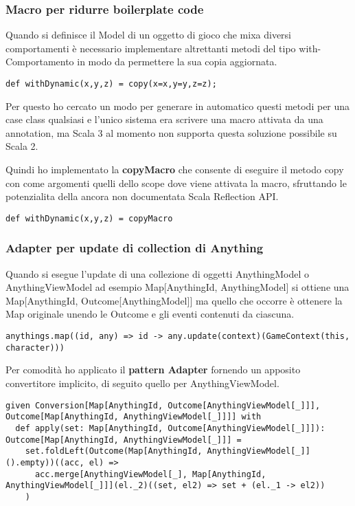 \subsubsection{Macro per ridurre boilerplate code}
Quando si definisce il Model di un oggetto di gioco che mixa diversi comportamenti è necessario implementare altrettanti metodi del tipo with-Comportamento in modo da permettere la sua copia aggiornata. 

\begin{lstlisting}[basicstyle=\tiny]
def withDynamic(x,y,z) = copy(x=x,y=y,z=z); 
\end{lstlisting}

Per questo ho cercato un modo per generare in automatico questi metodi per una case class qualsiasi e l'unico sistema era scrivere una macro attivata da una annotation, ma Scala 3 al momento non supporta questa soluzione possibile su Scala 2.

Quindi ho implementato la \textbf{copyMacro} che consente di eseguire il metodo copy con come argomenti quelli dello scope dove viene attivata la macro, sfruttando le potenzialita della ancora non documentata Scala Reflection API. 

\begin{lstlisting}[basicstyle=\tiny]
def withDynamic(x,y,z) = copyMacro
\end{lstlisting}

\subsubsection{Adapter per update di collection di Anything}

Quando si esegue l'update di una collezione di oggetti AnythingModel o AnythingViewModel ad esempio Map[AnythingId, AnythingModel] si ottiene una Map[AnythingId, Outcome[AnythingModel]] ma quello che occorre è ottenere la Map originale unendo le Outcome e gli eventi contenuti da ciascuna.

\begin{lstlisting}[basicstyle=\tiny]
anythings.map((id, any) => id -> any.update(context)(GameContext(this, character)))
\end{lstlisting}

Per comodità ho applicato il \textbf{pattern Adapter} fornendo un apposito convertitore implicito, di seguito quello per AnythingViewModel.

\begin{lstlisting}[basicstyle=\tiny]
given Conversion[Map[AnythingId, Outcome[AnythingViewModel[_]]], Outcome[Map[AnythingId, AnythingViewModel[_]]]] with
  def apply(set: Map[AnythingId, Outcome[AnythingViewModel[_]]]): Outcome[Map[AnythingId, AnythingViewModel[_]]] =
    set.foldLeft(Outcome(Map[AnythingId, AnythingViewModel[_]]().empty))((acc, el) =>
      acc.merge[AnythingViewModel[_], Map[AnythingId, AnythingViewModel[_]]](el._2)((set, el2) => set + (el._1 -> el2))
    )
\end{lstlisting}

